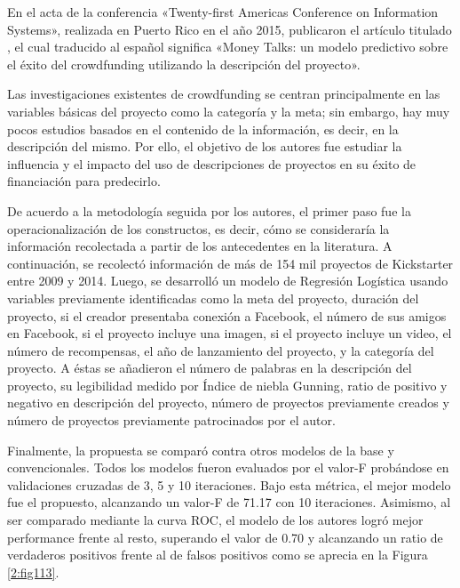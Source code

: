 En el acta de la conferencia «Twenty-first Americas Conference on Information Systems», realizada en Puerto Rico en el año 2015, \cite{pr_zhou2015projectdesc} publicaron el artículo titulado , el cual traducido al español significa «Money Talks: un modelo predictivo sobre el éxito del crowdfunding utilizando la descripción del proyecto».

Las investigaciones existentes de crowdfunding se centran principalmente en las variables básicas del proyecto como la categoría y la meta; sin embargo, hay muy pocos estudios basados en el contenido de la información, es decir, en la descripción del mismo. Por ello, el objetivo de los autores fue estudiar la influencia y el impacto del uso de descripciones de proyectos en su éxito de financiación para predecirlo.

De acuerdo a la metodología seguida por los autores, el primer paso fue la operacionalización de los constructos, es decir, cómo se consideraría la información recolectada a partir de los antecedentes en la literatura. A continuación, se recolectó información de más de 154 mil proyectos de Kickstarter entre 2009 y 2014. Luego, se desarrolló un modelo de Regresión Logística usando variables previamente identificadas como la meta del proyecto, duración del proyecto, si el creador presentaba conexión a Facebook, el número de sus amigos en Facebook, si el proyecto incluye una imagen, si el proyecto incluye un video, el número de recompensas, el año de lanzamiento del proyecto, y la categoría del proyecto. A éstas se añadieron el número de palabras en la descripción del proyecto, su legibilidad medido por Índice de niebla Gunning, ratio de positivo y negativo en descripción del proyecto, número de proyectos previamente creados y número de proyectos previamente patrocinados por el autor.

Finalmente, la propuesta se comparó contra otros modelos de la base y convencionales. Todos los modelos fueron evaluados por el valor-F probándose en validaciones cruzadas de 3, 5 y 10 iteraciones. Bajo esta métrica, el mejor modelo fue el propuesto, alcanzando un valor-F de 71.17 con 10 iteraciones. Asimismo, al ser comparado mediante la curva ROC, el modelo de los autores logró mejor performance frente al resto, superando el valor de 0.70 y alcanzando un ratio de verdaderos positivos frente al de falsos positivos como se aprecia en la Figura \ref{2:fig113}.

